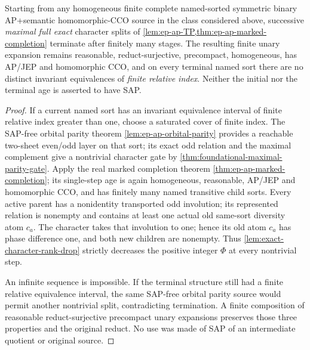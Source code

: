 \begin{theorem}
\label{thm:ap-finite-character-elimination}
Starting from any homogeneous finite complete
named-sorted symmetric binary AP+semantic
homomorphic-CCO source in the class considered
above, successive \emph{maximal full exact}
character splits of
\cref{lem:ep-ap-TP,thm:ep-ap-marked-completion}
terminate after finitely many stages.
The resulting finite unary expansion remains
reasonable, reduct-surjective, precompact,
homogeneous, has AP/JEP and homomorphic
CCO, and on every terminal named sort
there are no distinct invariant equivalences
of \emph{finite relative index}.
Neither the initial nor the terminal age
is asserted to have SAP.
\end{theorem}
\begin{proof}
If a current named sort has an invariant
equivalence interval of finite relative
index greater than one, choose a saturated
cover of finite index. The SAP-free orbital
parity theorem
\cref{lem:ep-ap-orbital-parity} provides a
reachable two-sheet even/odd layer on that
sort; its exact odd relation and the maximal
complement give a nontrivial character gate
by \cref{thm:foundational-maximal-parity-gate}.
Apply the real marked completion theorem
\cref{thm:ep-ap-marked-completion}; its
single-step age is again homogeneous,
reasonable, AP/JEP and homomorphic CCO,
and has finitely many named transitive
child sorts. Every active parent has a
nonidentity transported odd involution;
its represented relation is nonempty and
contains at least one actual old
same-sort diversity atom $c_a$. The character
takes that involution to one; hence its
old atom $c_a$ has phase difference one,
and both new children are nonempty.
Thus \cref{lem:exact-character-rank-drop}
strictly decreases the positive integer
$\Phi$ at every nontrivial step.

An infinite sequence is impossible.
If the terminal structure still had a
finite relative equivalence interval,
the same SAP-free orbital parity source
would permit another nontrivial split,
contradicting termination. A finite
composition of reasonable reduct-surjective
precompact unary expansions preserves
those three properties and the original
reduct. No use was made of SAP of an
intermediate quotient or original source.
\end{proof}

